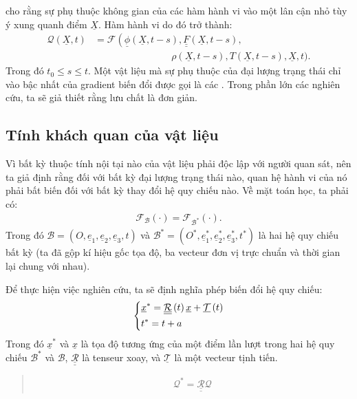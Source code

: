 \documentclass[../../../main.tex]{subfiles}
\begin{document}
     cho rằng sự phụ thuộc không gian của các hàm hành vi vào một lân cận nhỏ tùy ý xung quanh điểm $\underline{X}$. Hàm hành vi do đó trở thành:
		\begin{equation}
    		\begin{aligned}
    			\mathcal{Q}\left(\underline{X},t\right)&=\mathcal{F}\left(\underline{\phi}\left(\underline{X},t-s\right),\underline{\underline{F}}\left(\underline{X},t-s\right),\right.\\
				&\qquad\qquad\qquad\qquad\rho\left(\underline{X},t-s\right),T\left(\underline{X},t-s\right),\underline{X},t\bigr).
			\end{aligned}
    	\end{equation}
    Trong đó $t_0\leq s\leq t$. Một vật liệu mà sự phụ thuộc của đại lượng trạng thái chỉ vào bậc nhất của gradient biến đổi được gọi là các . Trong phần lớn các nghiên cứu, ta sẽ giả thiết rằng lưu chất là đơn giản.
\subsection{Tính khách quan của vật liệu}
	Vì bất kỳ thuộc tính nội tại nào của vật liệu phải độc lập với người quan sát, nên ta giả định rằng đối với bất kỳ đại lượng trạng thái nào, quan hệ hành vi của nó phải bất biến đối với bất kỳ thay đổi hệ quy chiếu nào. Về mặt toán học, ta phải có:
		\begin{align}
			\mathcal{F}_{\mathcal{B}}\left(\cdot\right)=\mathcal{F}_{\mathcal{B}^*}\left(\cdot\right).
		\end{align}
	Trong đó $\mathcal{B}=\left(O,\underline{e}_1,\underline{e}_2,\underline{e}_3,t\right)$ và $\mathcal{B}^*=\left(O^*,\underline{e}_1^*,\underline{e}_2^*,\underline{e}_3^*,t^*\right)$ là hai hệ quy chiếu bất kỳ (ta đã gộp kí hiệu gốc tọa độ, ba vecteur đơn vị trực chuẩn và thời gian lại chung với nhau).
	
	Để thực hiện việc nghiên cứu, ta sẽ định nghĩa phép biến đổi hệ quy chiếu:
		\begin{equation}
			\begin{dcases}
				\underline{x}^*=\underline{\underline{\mathcal{R}}}\left(t\right)\underline{x}+\underline{\mathcal{T}}\left(t\right)\\
				t^*=t+a
			\end{dcases}
		\end{equation}
	Trong đó $\underline{x}^*$ và $\underline{x}$ là tọa độ tương ứng của một điểm lần lượt trong hai hệ quy chiếu $\mathcal{B}^*$ và $\mathcal{B}$, $\underline{\underline{\mathcal{R}}}$ là tenseur xoay, và $\underline{\mathcal{T}}$ là một vecteur tịnh tiến.
		\begin{quotation}
				\begin{align}
					\mathcal{Q}^*=\underline{\underline{\mathcal{R}}}\mathcal{Q}
				\end{align}
		\end{quotation}
\end{document}
